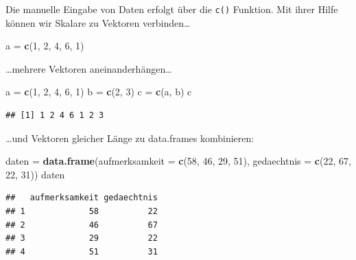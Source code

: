 \documentclass[
]{book}
\newenvironment{Shaded}{\begin{snugshade}}{\end{snugshade}}
\newcommand{\AttributeTok}[1]{\textcolor[rgb]{0.13,0.29,0.53}{#1}}
\newcommand{\DecValTok}[1]{\textcolor[rgb]{0.00,0.00,0.81}{#1}}
\newcommand{\FunctionTok}[1]{\textcolor[rgb]{0.13,0.29,0.53}{\textbf{#1}}}
\newcommand{\NormalTok}[1]{#1}
\newcommand{\OtherTok}[1]{\textcolor[rgb]{0.56,0.35,0.01}{#1}}
\begin{document}
Die manuelle Eingabe von Daten erfolgt über die \texttt{c()} Funktion. Mit ihrer Hilfe können wir Skalare zu Vektoren verbinden\ldots{}

\begin{Shaded}
\begin{Highlighting}[]
\NormalTok{a }\OtherTok{=} \FunctionTok{c}\NormalTok{(}\DecValTok{1}\NormalTok{, }\DecValTok{2}\NormalTok{, }\DecValTok{4}\NormalTok{, }\DecValTok{6}\NormalTok{, }\DecValTok{1}\NormalTok{)}
\end{Highlighting}
\end{Shaded}

\ldots mehrere Vektoren aneinanderhängen\ldots{}

\begin{Shaded}
\begin{Highlighting}[]
\NormalTok{a }\OtherTok{=} \FunctionTok{c}\NormalTok{(}\DecValTok{1}\NormalTok{, }\DecValTok{2}\NormalTok{, }\DecValTok{4}\NormalTok{, }\DecValTok{6}\NormalTok{, }\DecValTok{1}\NormalTok{)}
\NormalTok{b }\OtherTok{=} \FunctionTok{c}\NormalTok{(}\DecValTok{2}\NormalTok{, }\DecValTok{3}\NormalTok{)}
\NormalTok{c }\OtherTok{=} \FunctionTok{c}\NormalTok{(a, b)}
\NormalTok{c}
\end{Highlighting}
\end{Shaded}

\begin{verbatim}
## [1] 1 2 4 6 1 2 3
\end{verbatim}

\ldots und Vektoren gleicher Länge zu data.frames kombinieren:

\begin{Shaded}
\begin{Highlighting}[]
\NormalTok{daten }\OtherTok{=} \FunctionTok{data.frame}\NormalTok{(}\AttributeTok{aufmerksamkeit =} \FunctionTok{c}\NormalTok{(}\DecValTok{58}\NormalTok{, }\DecValTok{46}\NormalTok{, }\DecValTok{29}\NormalTok{, }\DecValTok{51}\NormalTok{),}
                   \AttributeTok{gedaechtnis =} \FunctionTok{c}\NormalTok{(}\DecValTok{22}\NormalTok{, }\DecValTok{67}\NormalTok{, }\DecValTok{22}\NormalTok{, }\DecValTok{31}\NormalTok{))}
\NormalTok{daten}
\end{Highlighting}
\end{Shaded}

\begin{verbatim}
##   aufmerksamkeit gedaechtnis
## 1             58          22
## 2             46          67
## 3             29          22
## 4             51          31
\end{verbatim}
\end{document}
